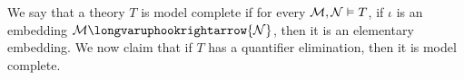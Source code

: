 \documentclass[10pt]{article}
\def\iff{\,\longvarLeftRightarrow\,}
\let\injection=\longvaruphookrightarrow
\def\mM{{\cal M}}
\def\mN{{\cal N}}
\begin{document}




        \item We say that a theory $T$ is model complete if for every $\mM,\mN\vDash T$, if $\iota$ is an embedding $\mM\injection\mN$, then it is an elementary embedding.
        We now claim that if $T$ has a quantifier elimination, then it is model complete.
\end{document}
